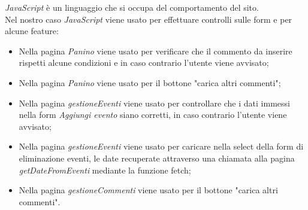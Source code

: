 \emph{JavaScript} è un linguaggio che si occupa del comportamento del sito.\\
Nel nostro caso \emph{JavaScript} viene usato per effettuare controlli sulle form e per alcune feature:
\begin{itemize}
    \item Nella pagina \emph{Panino} viene usato per verificare che il commento da inserire rispetti alcune condizioni e in caso contrario l'utente viene avvisato;
    \item Nella pagina \emph{Panino} viene usato per il bottone "carica altri commenti";
    \item Nella pagina \emph{gestioneEventi} viene usato per controllare che i dati immessi nella form \emph{Aggiungi evento} siano corretti, in caso contrario l'utente viene avvisato;
    \item Nella pagina \emph{gestioneEventi} viene usato per caricare nella select della form di eliminazione eventi, le date recuperate attraverso una chiamata alla pagina \emph{getDateFromEventi} mediante la funzione fetch;
    \item Nella pagina \emph{gestioneCommenti} viene usato per il bottone "carica altri commenti".
\end{itemize}

